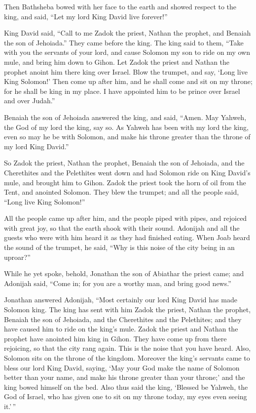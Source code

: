  Then Bathsheba bowed with her face to the earth and
showed respect to the king, and said, ``Let my lord King David live
forever!''

 King David said, ``Call to me Zadok the priest, Nathan
the prophet, and Benaiah the son of Jehoiada.'' They came before the
king.  The king said to them, ``Take with you the
servants of your lord, and cause Solomon my son to ride on my own mule,
and bring him down to Gihon.  Let Zadok the priest and
Nathan the prophet anoint him there king over Israel. Blow the trumpet,
and say, `Long live King Solomon!'  Then come up after
him, and he shall come and sit on my throne; for he shall be king in my
place. I have appointed him to be prince over Israel and over Judah.''

 Benaiah the son of Jehoiada answered the king, and said,
``Amen. May Yahweh, the God of my lord the king, say so. 
As Yahweh has been with my lord the king, even so may he be with
Solomon, and make his throne greater than the throne of my lord King
David.''

 So Zadok the priest, Nathan the prophet, Benaiah the son
of Jehoiada, and the Cherethites and the Pelethites went down and had
Solomon ride on King David's mule, and brought him to Gihon.
 Zadok the priest took the horn of oil from the Tent, and
anointed Solomon. They blew the trumpet; and all the people said, ``Long
live King Solomon!''

 All the people came up after him, and the people piped
with pipes, and rejoiced with great joy, so that the earth shook with
their sound.  Adonijah and all the guests who were with
him heard it as they had finished eating. When Joab heard the sound of
the trumpet, he said, ``Why is this noise of the city being in an
uproar?''

 While he yet spoke, behold, Jonathan the son of Abiathar
the priest came; and Adonijah said, ``Come in; for you are a worthy man,
and bring good news.''

 Jonathan answered Adonijah, ``Most certainly our lord
King David has made Solomon king.  The king has sent with
him Zadok the priest, Nathan the prophet, Benaiah the son of Jehoiada,
and the Cherethites and the Pelethites; and they have caused him to ride
on the king's mule.  Zadok the priest and Nathan the
prophet have anointed him king in Gihon. They have come up from there
rejoicing, so that the city rang again. This is the noise that you have
heard.  Also, Solomon sits on the throne of the kingdom.
 Moreover the king's servants came to bless our lord King
David, saying, `May your God make the name of Solomon better than your
name, and make his throne greater than your throne;' and the king bowed
himself on the bed.  Also thus said the king, `Blessed be
Yahweh, the God of Israel, who has given one to sit on my throne today,
my eyes even seeing it.'\,''

